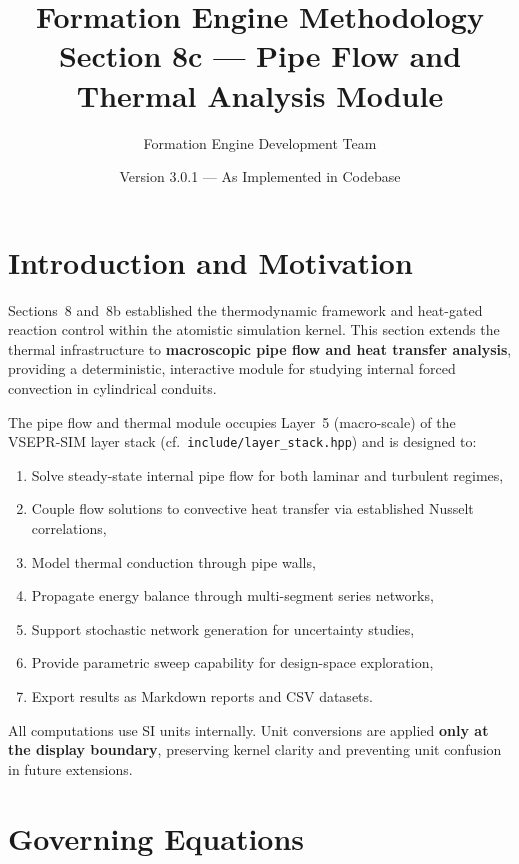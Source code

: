 \documentclass[11pt]{article}
\title{\textbf{Formation Engine Methodology} \\
\Large Section 8c --- Pipe Flow and Thermal Analysis Module}
\author{Formation Engine Development Team}
\date{Version 3.0.1 --- As Implemented in Codebase}
\begin{document}
\maketitle

\tableofcontents
\newpage

\section{Introduction and Motivation}

Sections~8 and~8b established the thermodynamic framework and heat-gated
reaction control within the atomistic simulation kernel.  This section
extends the thermal infrastructure to \textbf{macroscopic pipe flow and
heat transfer analysis}, providing a deterministic, interactive module
for studying internal forced convection in cylindrical conduits.

The pipe flow and thermal module occupies Layer~5 (macro-scale) of the
VSEPR-SIM layer stack (cf.\ \texttt{include/layer\_stack.hpp}) and is
designed to:

\begin{enumerate}
  \item Solve steady-state internal pipe flow for both laminar and turbulent
        regimes,
  \item Couple flow solutions to convective heat transfer via established
        Nusselt correlations,
  \item Model thermal conduction through pipe walls,
  \item Propagate energy balance through multi-segment series networks,
  \item Support stochastic network generation for uncertainty studies,
  \item Provide parametric sweep capability for design-space exploration,
  \item Export results as Markdown reports and CSV datasets.
\end{enumerate}

All computations use SI units internally.  Unit conversions are applied
\textbf{only at the display boundary}, preserving kernel clarity and
preventing unit confusion in future extensions.

\section{Governing Equations}
\end{document}
